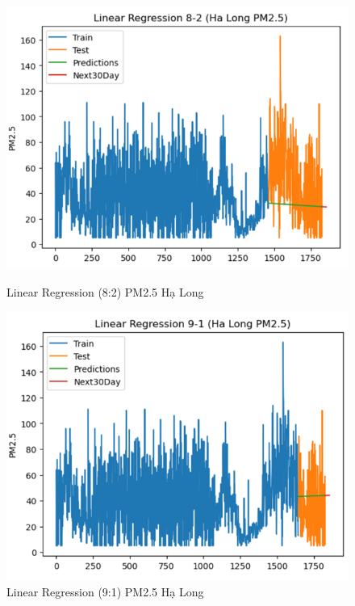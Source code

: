 \begin{figure}[h]
\begin{minipage}[b]{0.45\linewidth}
    \end{minipage}
        \begin{minipage}[b]{0.45\linewidth}
        \centering
        \includegraphics[width=\linewidth]{img/LN_8_2_HL.png}
        \caption{\scriptsize Linear Regression (8:2) PM2.5 Hạ Long}
        \label{fig1}
    \end{minipage}\hfill
    \begin{minipage}[b]{0.45\linewidth}
        \centering
        \includegraphics[width=\linewidth]{img/LN_9_1_HL.png}
        \caption{\scriptsize Linear Regression (9:1) PM2.5 Hạ Long}
        \label{fig2}
    \end{minipage}

\end{figure}
